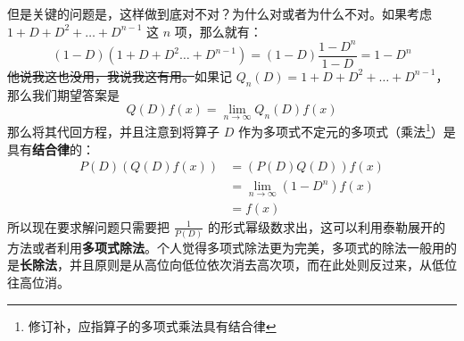 \documentclass{article}
\begin{document}
\noindent 但是关键的问题是，这样做到底对不对？为什么对或者为什么不对。如果考虑 $1+D+D^2+\ldots+D^{n-1}$ 这 $n$ 项，那么就有：
$$
(1-D)(1+D+D^2\ldots+D^{n-1})=(1-D)\frac{1-D^n}{1-D} = 1-D^n
$$
\sout{他说我这也没用，我说我这有用。}如果记 $Q_n(D) = 1+D+D^2+\ldots+D^{n-1}$，那么我们期望答案是
$$
Q(D)f(x) = \lim_{n\to \infty} Q_n(D)f(x)
$$
那么将其代回方程，并且注意到将算子 $D$ 作为多项式不定元的多项式（乘法\footnote{修订补，应指算子的多项式乘法具有结合律}）是具有\textbf{结合律}的：
\begin{align*}
    P(D)\left(Q(D)f(x)\right) &= \left(P(D)Q(D)\right)f(x)\\
    &= \lim_{n\to \infty}(1-D^n) f(x)\\
    &= f(x)
\end{align*}
所以现在要求解问题只需要把 $\frac{1}{P(D)}$ 的形式幂级数求出，这可以利用泰勒展开的方法或者利用\textbf{多项式除法}。个人觉得多项式除法更为完美，多项式的除法一般用的是\textbf{长除法}，并且原则是从高位向低位依次消去高次项，而在此处则反过来，从低位往高位消。

\begin{center}
\end{center}
\end{document}
